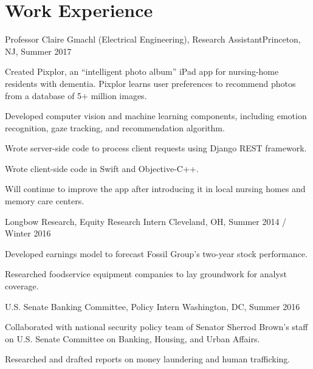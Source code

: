 \documentclass[12pt]{my_resume}
\begin{document}
\section{Work Experience}

\begin{resitem}{Professor Claire Gmachl (Electrical Engineering), Research %
Assistant}{Princeton, NJ, Summer 2017}
  \item Created Pixplor, an “intelligent photo album” iPad app for %
  nursing-home residents with dementia. Pixplor learns user preferences %
  to recommend photos from a database of 5+ million images.
  \item Developed computer vision and machine learning components, %
  including emotion recognition, gaze tracking, and recommendation %
  algorithm.
  \item Wrote server-side code to process client requests using Django %
  REST framework.
  \item Wrote client-side code in Swift and Objective-C++.
  \item Will continue to improve the app after introducing it in local %
  nursing homes and memory care centers.
\end{resitem}

\vspace{-8pt}

\begin{resitem}{Longbow Research, Equity Research Intern}%
{Cleveland, OH, Summer 2014 / Winter 2016}
  \item Developed earnings model to forecast Fossil Group's two-year %
  stock performance.
  \item Researched foodservice equipment companies to lay groundwork %
  for analyst coverage.
\end{resitem}

\vspace{-8pt}

\begin{resitem}{U.S. Senate Banking Committee, Policy Intern}%
{Washington, DC, Summer 2016}
  \item Collaborated with national security policy team of Senator %
  Sherrod Brown's staff on U.S. Senate Committee on Banking, Housing, and %
  Urban Affairs.
  \item Researched and drafted reports on money laundering and human %
  trafficking.
\end{resitem}
\end{document}
